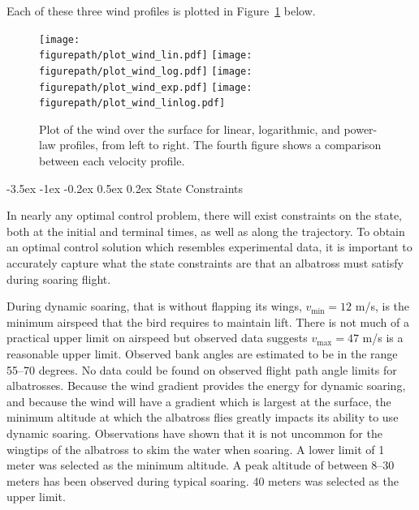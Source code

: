 \documentclass[11pt,letterpaper,onecolumn]{article}
\makeatletter
\newcommand{\figurepath}{../fig/term-project}
\renewcommand\subsection{\@startsection{subsection}{1}{\z@}%
{-3.5ex \@plus-1ex \@minus-0.2ex}%
{0.5ex \@plus0.2ex}%
{\fontsize{10pt}{10pt}\selectfont\bfseries\sffamily}}
\makeatother
\begin{document}
  Each of these three wind profiles is plotted in Figure~\ref{fig.windplot} below.

  \begin{figure}[h]
    \begin{center}
      \texttt{[image: \\figurepath/plot\_wind\_lin.pdf]}
      \texttt{[image: \\figurepath/plot\_wind\_log.pdf]}
      \texttt{[image: \\figurepath/plot\_wind\_exp.pdf]}
      \texttt{[image: \\figurepath/plot\_wind\_linlog.pdf]}
      \caption{Plot of the wind over the surface for linear, logarithmic, and power-law profiles, from left to right. The fourth figure shows a comparison between each velocity profile.\label{fig.windplot}}
    \end{center}
  \end{figure}

  \subsection{State Constraints}\label{subsec.stateconstraints}

  In nearly any optimal control problem, there will exist constraints on the state, both at the initial and terminal times, as well as along the trajectory.
  To obtain an optimal control solution which resembles experimental data, it is important to accurately capture what the state constraints are that an albatross must satisfy during soaring flight.

  During dynamic soaring, that is without flapping its wings, $v_{\text{min}}=12$ m/s, is the minimum airspeed that the bird requires to maintain lift\cite{wilson.sweeping.1975,videler.avianflightbook.2005}.
  There is not much of a practical upper limit on airspeed\cite{catry.sustainedfast.2004} but observed data suggests $v_{\text{max}}=47$ m/s is a reasonable upper limit.
  Observed bank angles are estimated to be in the range 55--70 degrees.\cite{idrac.experimentelle.1932,pennycuick.gust.2002} No data could be found on observed flight path angle limits for albatrosses.
  Because the wind gradient provides the energy for dynamic soaring, and because the wind will have a gradient which is largest at the surface, the minimum altitude at which the albatross flies greatly impacts its ability to use dynamic soaring.
  Observations have shown that it is not uncommon for the wingtips of the albatross to skim the water when soaring.
  A lower limit of 1 meter was selected as the minimum altitude.
  A peak altitude of between 8--30 meters has been observed during typical soaring.
  40 meters was selected as the upper limit.
\end{document}
